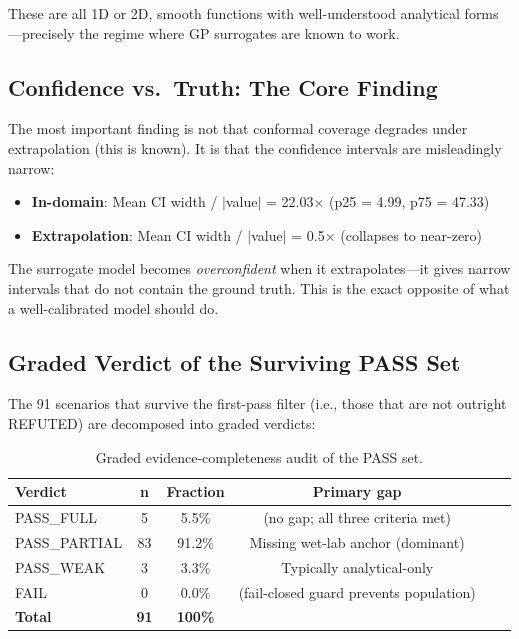 \documentclass[journal]{IEEEtran}
\begin{document}
These are all 1D or 2D, smooth functions with well-understood analytical forms
---precisely the regime where GP surrogates are known to work.

\subsection{Confidence vs.\ Truth: The Core Finding}

The most important finding is not that conformal coverage degrades under
extrapolation (this is known). It is that the confidence intervals are
misleadingly narrow:

\begin{itemize}
    \item \textbf{In-domain}: Mean CI width / $|$value$|$ = 22.03$\times$
    (p25 = 4.99, p75 = 47.33)
    \item \textbf{Extrapolation}: Mean CI width / $|$value$|$ = 0.5$\times$
    (collapses to near-zero)
\end{itemize}

The surrogate model becomes \textit{overconfident} when it extrapolates---it
gives narrow intervals that do not contain the ground truth. This is the exact
opposite of what a well-calibrated model should do.

\subsection{Graded Verdict of the Surviving PASS Set}

The 91 scenarios that survive the first-pass filter (i.e., those that are not
outright REFUTED) are decomposed into graded verdicts:

\begin{table}[!t]
\caption{Graded evidence-completeness audit of the PASS set.}
\label{tab:graded}
\centering
\begin{tabular}{lccccc}
\toprule
\textbf{Verdict} & \textbf{n} & \textbf{Fraction} & \textbf{Primary gap} \\
\midrule
PASS\_FULL & 5 & 5.5\% & (no gap; all three criteria met) \\
PASS\_PARTIAL & 83 & 91.2\% & Missing wet-lab anchor (dominant) \\
PASS\_WEAK & 3 & 3.3\% & Typically analytical-only \\
FAIL & 0 & 0.0\% & (fail-closed guard prevents population) \\
\textbf{Total} & \textbf{91} & \textbf{100\%} & \\
\bottomrule
\end{tabular}
\end{table}
\end{document}
